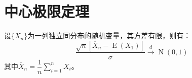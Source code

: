\section{中心极限定理}

\begin{theorem}\label{theo:CLT}
	设$\{X_n\}$为一列独立同分布的随机变量，其方差有限，则有：
	\begin{equation*}
		\frac{\sqrt{n}[\overline{X}_n-\operatorname{E}(X_1)]}{\sigma}\overset{d}{\longrightarrow}\operatorname{N}(0,1)
	\end{equation*}
	其中$\overline{X}_n=\dfrac{1}{n}\sum\limits_{i=1}^{n}X_i$。
\end{theorem}